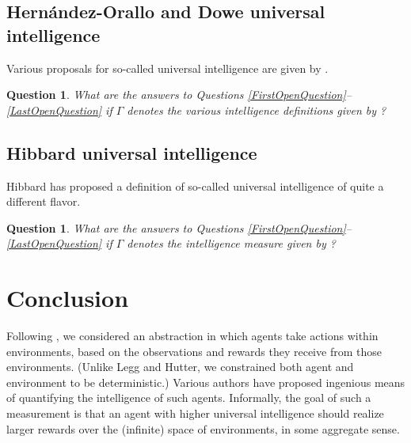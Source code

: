 \documentclass[twoside,11pt]{article}
\newtheorem{question}[theorem]{Question}
\begin{document}
\subsection{Hern\'andez-Orallo and Dowe universal intelligence}

Various proposals for so-called universal intelligence are given by \citet{hernandez}.

\begin{question}
    What are the answers to Questions \ref{FirstOpenQuestion}--\ref{LastOpenQuestion}
    if $\varGamma$ denotes the various intelligence definitions
    given by \citet{hernandez}?
\end{question}


\subsection{Hibbard universal intelligence}

Hibbard has proposed \citep{hibbard} a definition of so-called universal intelligence
of quite a different flavor.

\begin{question}
\label{ReallyLastOpenquestion}
    What are the answers to Questions \ref{FirstOpenQuestion}--\ref{LastOpenQuestion}
    if $\varGamma$ denotes the intelligence measure given by
    \citet{hibbard}?
\end{question}

\section{Conclusion}
\label{conclusionsection}

Following \citet{hutter2007}, we considered an abstraction in
which agents take actions within environments, based on the observations and
rewards they receive from those environments.
(Unlike Legg and Hutter, we constrained both agent and environment to be
deterministic.)
Various authors
\citep{hutter2007, hernandez, hibbard} have proposed
ingenious means of quantifying the intelligence
of such agents.
Informally, the goal of such a measurement is that
an agent with higher universal intelligence should realize larger rewards
over the (infinite) space of environments, in some aggregate
sense.
\end{document}
